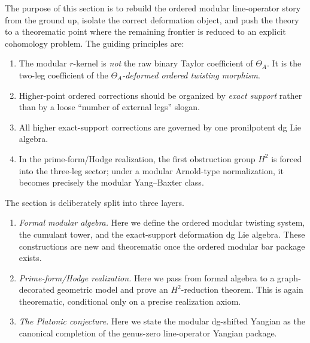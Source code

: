 The purpose of this section is to rebuild the ordered modular line-operator story from the ground
up, isolate the correct deformation object, and push the theory to a theorematic point where the
remaining frontier is reduced to an explicit cohomology problem. The guiding principles are:

\begin{enumerate}
\item
The modular $r$-kernel is \emph{not} the raw binary Taylor coefficient of $\Theta_A$.
It is the two-leg coefficient of the \emph{$\Theta_A$-deformed ordered twisting morphism}.
\item
Higher-point ordered corrections should be organized by \emph{exact support} rather than by
a loose ``number of external legs'' slogan.
\item
All higher exact-support corrections are governed by one pronilpotent dg Lie algebra.
\item
In the prime-form/Hodge realization, the first obstruction group $H^2$ is forced into the
three-leg sector; under a modular Arnold-type normalization, it becomes precisely the
modular Yang--Baxter class.
\end{enumerate}

The section is deliberately split into three layers.

\begin{enumerate}
\item[(I)]
\emph{Formal modular algebra.}
Here we define the ordered modular twisting system, the cumulant tower, and the exact-support
deformation dg Lie algebra. These constructions are new and theorematic once the ordered modular
bar package exists.

\item[(II)]
\emph{Prime-form/Hodge realization.}
Here we pass from formal algebra to a graph-decorated geometric model and prove an $H^2$-reduction
theorem. This is again theorematic, conditional only on a precise realization axiom.

\item[(III)]
\emph{The Platonic conjecture.}
Here we state the modular dg-shifted Yangian as the canonical completion of the genus-zero
line-operator Yangian package.
\end{enumerate}

